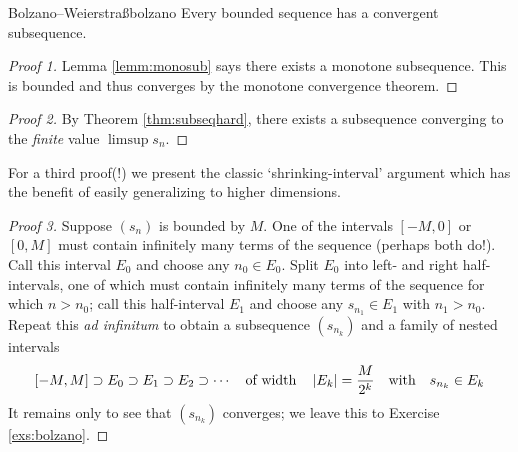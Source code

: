 \begin{thm}{Bolzano--Weierstraß}{bolzano}
	Every bounded sequence has a convergent subsequence.
\end{thm}


\begin{proof}[Proof 1]
	Lemma \ref{lemm:monosub} says there exists a monotone subsequence. This is bounded and thus converges by the monotone convergence theorem.
\end{proof}

\begin{proof}[Proof 2]
	By Theorem \ref{thm:subseqhard}, there exists a subsequence converging to the \emph{finite} value $\limsup s_n$.
\end{proof}

For a third proof(!) we present the classic `shrinking-interval' argument which has the benefit of easily generalizing to higher dimensions.

\begin{proof}[Proof 3]
	Suppose $(s_n)$ is bounded by $M$. One of the intervals $[-M,0]$ or $[0,M]$ must contain infinitely many terms of the sequence (perhaps both do!). Call this interval $E_0$ and choose any $n_0\in E_0$.\smallbreak
	Split $E_0$ into left- and right half-intervals, one of which must contain infinitely many terms of the sequence for which $n>n_0$;\footnotemark{} call this half-interval $E_1$ and choose any $s_{n_1}\in E_1$ with $n_1>n_0$.\smallbreak
	Repeat this \emph{ad infinitum} to obtain a subsequence $(s_{n_k})$ and a family of nested intervals
	\[
		[-M,M]\supset E_0\supset E_1\supset E_2\supset\cdots\quad\text{of width}\quad\left| E_k\right|=\frac{M}{2^k}\quad\text{with}\quad s_{n_k}\in E_k
	\]
	It remains only to see that $(s_{n_k})$ converges; we leave this to Exercise \ref{exs:bolzano}.%
\end{proof}



